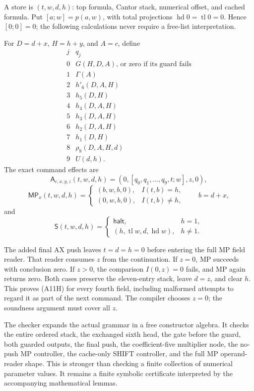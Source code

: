 A store is $(t,w,d,h)$: top formula, Cantor stack, numerical offset,
and cached formula.  Put $[a;w]=p(a,w)$, with total projections
$\operatorname{hd}0=\operatorname{tl}0=0$.  Hence $[0;0]=0$;
the following calculations never require a free-list interpretation.

For $D=d+x$, $H=h+y$, and $A=c$, define
\[
\begin{array}{c|l}
j&q_j\\\hline
0&G(H,D,A)\text{, or zero if its guard fails}\\
1&\Gamma(A)\\
2&h'_6(D,A,H)\\
3&h_5(D,H)\\
4&h_4(D,A,H)\\
5&h_3(D,A,H)\\
6&h_2(D,A,H)\\
7&h_1(D,H)\\
8&\rho_8(D,A,H,d)\\
9&U(d,h).
\end{array}
\]
The exact command effects are
\[
 \mathsf A_{c,x,y,z}(t,w,d,h)
       =(0,[q_0,q_1,\ldots,q_9,t;w],z,0),
 \tag{A11H}
\]
\[
 \mathsf{MP}_x(t,w,d,h)=
 \begin{cases}(b,w,b,0),&I(t,b)=h,\\
 (0,w,b,0),&I(t,b)\ne h,
 \end{cases}
 \qquad b=d+x,
 \tag{MPH}
\]
and
\[
 \mathsf S(t,w,d,h)=
 \begin{cases}\mathsf{halt},&h=1,\\
 (h,\operatorname{tl}w,d,\operatorname{hd}w),&h\ne1.
 \end{cases}
 \tag{SH}
\]

The added final AX push leaves $t=d=h=0$ before entering the full MP
field reader.  That reader consumes $z$ from the continuation.  If $z=0$,
MP succeeds with conclusion zero.  If $z>0$, the comparison
$I(0,z)=0$ fails, and MP again returns zero.  Both cases preserve the
eleven-entry stack, leave $d=z$, and clear $h$.  This proves (A11H) for
every fourth field, including malformed attempts to regard it as part of
the next command.  The compiler chooses $z=0$; the soundness argument
must cover all $z$.

The checker expands the actual grammar in a free constructor algebra.
It checks the entire ordered stack, the exchanged sixth head, the gate
before the guard, both guarded outputs, the final push, the coefficient-five
multiplier node, the no-push MP controller, the cache-only SHIFT controller,
and the full MP operand-reader shape.  This is stronger than checking a
finite collection of numerical parameter values.  It remains a finite
symbolic certificate interpreted by the accompanying mathematical lemmas.


